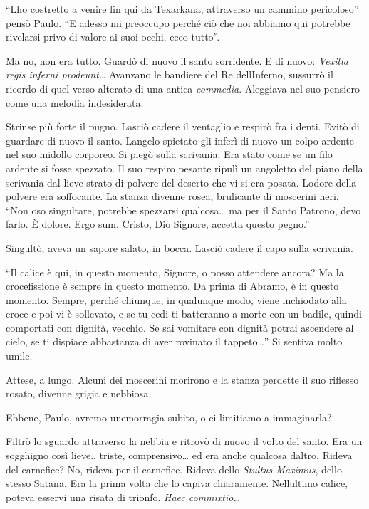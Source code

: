 ``L\textquotesingle ho costretto a venire fin qui da Texarkana,
attraverso un cammino pericoloso'' pensò Paulo. ``E adesso mi preoccupo
perché ciò che noi abbiamo qui potrebbe rivelarsi privo di valore ai
suoi occhi, ecco tutto''.

Ma no, non era tutto. Guardò di nuovo il santo sorridente. E di nuovo:
\emph{Vexilla regis inferni prodeunt\ldots{}} Avanzano le bandiere del
Re dell\textquotesingle Inferno, sussurrò il ricordo di quel verso
alterato di una antica \emph{commedia}. Aleggiava nel suo pensiero come
una melodia indesiderata.

Strinse più forte il pugno. Lasciò cadere il ventaglio e respirò fra i
denti. Evitò di guardare di nuovo il santo. L\textquotesingle angelo
spietato gli inferì di nuovo un colpo ardente nel suo midollo corporeo.
Si piegò sulla scrivania. Era stato come se un filo ardente si fosse
spezzato. Il suo respiro pesante ripulì un angoletto del piano della
scrivania dal lieve strato di polvere del deserto che vi si era posata.
L\textquotesingle odore della polvere era soffocante. La stanza divenne
rosea, brulicante di moscerini neri. ``Non oso singultare, potrebbe
spezzarsi qualcosa\ldots{} ma per il Santo Patrono, devo farlo. È
dolore. Ergo sum. Cristo, Dio Signore, accetta questo pegno.''

Singultò; aveva un sapore salato, in bocca. Lasciò cadere il capo sulla
scrivania.

``Il calice è qui, in questo momento, Signore, o posso attendere ancora?
Ma la crocefissione è sempre in questo momento. Da prima di Abramo, è in
questo momento. Sempre, perché chiunque, in qualunque modo, viene
inchiodato alla croce e poi vi è sollevato, e se tu cedi ti batteranno a
morte con un badile, quindi comportati con dignità, vecchio. Se sai
vomitare con dignità potrai ascendere al cielo, se ti dispiace
abbastanza di aver rovinato il tappeto\ldots'' Si sentiva molto umile.

Attese, a lungo. Alcuni dei moscerini morirono e la stanza perdette il
suo riflesso rosato, divenne grigia e nebbiosa.

Ebbene, Paulo, avremo un\textquotesingle emorragia subito, o ci
limitiamo a immaginarla?

Filtrò lo sguardo attraverso la nebbia e ritrovò di nuovo il volto del
santo. Era un sogghigno così lieve.. triste, comprensivo\ldots{} ed era
anche qualcosa d\textquotesingle altro. Rideva del carnefice? No, rideva
per il carnefice. Rideva dello \emph{Stultus Maximus}, dello stesso
Satana. Era la prima volta che lo capiva chiaramente.
Nell\textquotesingle ultimo calice, poteva esservi una risata di
trionfo. \emph{Haec commixtio\ldots{}}

